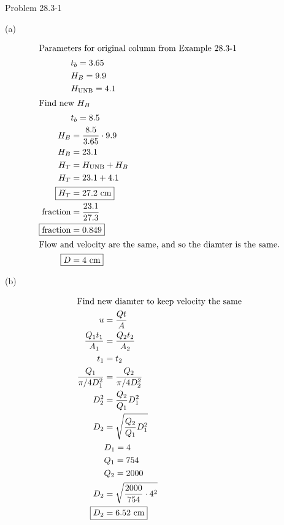 \item Problem 28.3-1

(a)

\begin{align*}
    \intertext{Parameters for original column from Example 28.3-1}
    & t_b = 3.65 \\
    & H_B = 9.9  \\
    & H_{\text{UNB}} = 4.1 \\
    \intertext{Find new $H_B$}
    & t_b = 8.5 \\
    H_B &= \frac{8.5}{3.65} \cdot 9.9 \\
    H_B &= 23.1 \\
    H_T &= H_{\text{UNB}} + H_B \\
    H_T &= 23.1 + 4.1 \\
    \Aboxed{H_T &= 27.2 \text{ cm}} \\
    \text{fraction} &= \frac{23.1}{27.3} \\
    \Aboxed{\text{fraction} &= 0.849} \\
    \intertext{Flow and velocity are the same, and so the diamter is the same.}
    \Aboxed{D &= 4 \text{ cm}}
\end{align*}

\newpage
(b)

\begin{align*}
    \intertext{Find new diamter to keep velocity the same}
    u &= \frac{Q t}{A} \\
    \frac{Q_1 t_1}{A_1} &= \frac{Q_2 t_2}{A_2} \\
    t_1 &= t_2 \\ 
    \frac{Q_1}{\pi/4D_1^2} &= \frac{Q_2}{\pi/4D_2^2} \\
    D_2^2 &= \frac{Q_2}{Q_1} D_1^2 \\
    D_2 &= \sqrt{\frac{Q_2}{Q_1} D_1^2} \\
    & D_1 = 4 \\
    & Q_1 = 754 \\
    & Q_2 = 2000 \\
    D_2 &= \sqrt{\frac{2000}{754} \cdot 4^2} \\
    \Aboxed{D_2 &= 6.52 \text{ cm}}
\end{align*}